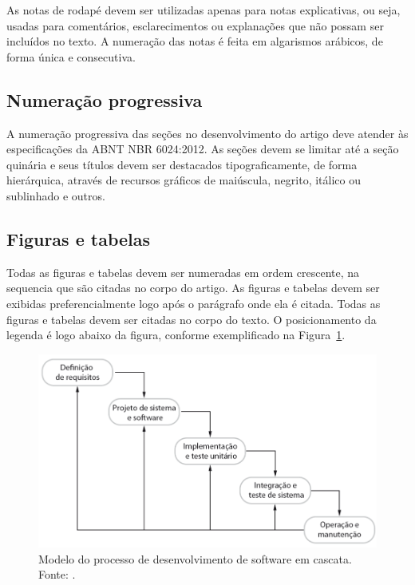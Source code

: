 \documentclass[article,a4paper,12pt,brazil,sumario=tradicional]{abntex2}
\begin{document}
As notas de rodapé devem ser utilizadas apenas para notas explicativas, ou seja, usadas para comentários, esclarecimentos ou explanações que não possam ser incluídos no texto. A numeração das notas é feita em algarismos arábicos, de forma única e consecutiva.

\subsection{Numeração progressiva}

A numeração progressiva das seções no desenvolvimento do artigo deve atender às especificações da ABNT NBR 6024:2012. As seções devem se limitar até a seção quinária e seus títulos devem ser destacados tipograficamente, de forma hierárquica, através de recursos gráficos de maiúscula, negrito, itálico ou sublinhado e outros.

\subsection{Figuras e tabelas}

Todas as figuras e tabelas devem ser numeradas em ordem crescente, na sequencia que são citadas no corpo do artigo. As figuras e tabelas devem ser exibidas preferencialmente logo após o parágrafo onde ela é citada. Todas as figuras e tabelas devem ser citadas no corpo do texto. O posicionamento da legenda é logo abaixo da figura, conforme exemplificado na Figura~\ref{fig:exampleFig1}.

\begin{figure}[!ht]
\centering
\includegraphics[width=1\textwidth]{Imagem1.png}
\caption{Modelo do processo de desenvolvimento de software em cascata. Fonte: \cite{sommerville2011software}.}
\label{fig:exampleFig1}
\end{figure}
\end{document}
